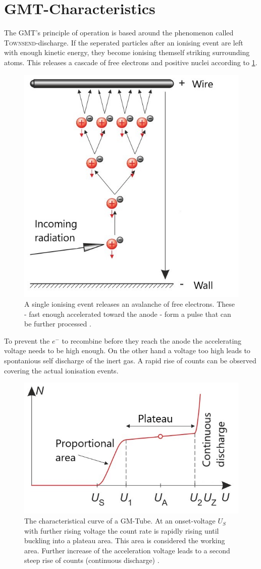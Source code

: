 \section{GMT-Characteristics}
%
%
The GMT's principle of operation is based around the phenomenon called \textsc{Townsend}-discharge. If the seperated
particles after an ionising event are left with enough kinetic energy, they become ionising themself striking surrounding
atoms. This releases a cascade of free electrons and positive nuclei according to \cref{fig:avalanche_discharge}.
\begin{figure}[h]
    \centering
    \includegraphics[width=.4\textwidth]{referenzen/scheme_avalanche.jpg}
    \caption{A single ionising event releases an avalanche of free electrons. These - fast enough accelerated toward the anode - form a pulse that can be further processed \cite{Eichler.2016}.}
    \label{fig:avalanche_discharge}
\end{figure}
To prevent the \(e^-\) to recombine before they reach the anode the accelerating voltage needs to be high enough. On the
other hand a voltage too high leads to spontanious self discharge of the inert gas. A rapid rise of counts can be observed
covering the actual ionisation events.
\begin{figure}[h]
    \centering
    \includegraphics[width=.5\textwidth]{referenzen/gmt_plot.jpg}
    \caption[Characteristical curve of a GMT]{The characteristical curve of a GM-Tube. At an onset-voltage \(U_S\) with
    further rising voltage the count rate is rapidly rising until buckling into a plateau area. This area is considered the
    working area. Further increase of the acceleration voltage leads to a second steep rise of counts (continuous discharge) \cite{Eichler.2016}.}
\end{figure}
